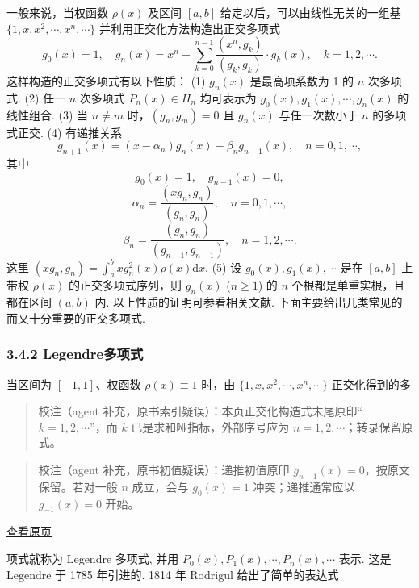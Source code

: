 \documentclass[
  10pt,
  fontset=fandol]{ctexart}
\begin{document}
一般来说，当权函数 \(\rho(x)\) 及区间 \([a, b]\) 给定以后，可以由线性无关的一组基 \(\{1,\allowbreak  x,\allowbreak  x^2,\allowbreak  \cdots,\allowbreak  x^n,\allowbreak  \cdots\}\) 并利用正交化方法构造出正交多项式 \[
g_0(x) = 1, \quad g_n(x) = x^n - \sum_{k=0}^{n-1} \frac{(x^n, g_k)}{(g_k, g_k)} \cdot g_k(x), \quad k = 1, 2, \cdots.
\] 这样构造的正交多项式有以下性质： (1) \(g_n(x)\) 是最高项系数为 1 的 \(n\) 次多项式. (2) 任一 \(n\) 次多项式 \(P_n(x) \in H_n\) 均可表示为 \(g_0(x), g_1(x), \cdots, g_n(x)\) 的线性组合. (3) 当 \(n \neq m\) 时，\((g_n, g_m) = 0\) 且 \(g_n(x)\) 与任一次数小于 \(n\) 的多项式正交. (4) 有递推关系 \[
g_{n+1}(x) = (x - \alpha_n)g_n(x) - \beta_n g_{n-1}(x), \quad n = 0, 1, \cdots,
\] 其中 \[
g_0(x) = 1, \quad g_{n-1}(x) = 0,
\] \[
\alpha_n = \frac{(xg_n, g_n)}{(g_n, g_n)}, \quad n = 0, 1, \cdots,
\] \[
\beta_n = \frac{(g_n, g_n)}{(g_{n-1}, g_{n-1})}, \quad n = 1, 2, \cdots.
\] 这里 \((xg_n, g_n) = \int_a^b xg_n^2(x) \rho(x) \mathrm{d}x.\) (5) 设 \(g_0(x), g_1(x), \cdots\) 是在 \([a, b]\) 上带权 \(\rho(x)\) 的正交多项式序列，则 \(g_n(x)\) (\(n \geq 1\)) 的 \(n\) 个根都是单重实根，且都在区间 \((a, b)\) 内. 以上性质的证明可参看相关文献. 下面主要给出几类常见的而又十分重要的正交多项式.

\subsubsection{3.4.2 Legendre多项式}\label{legendreux591aux9879ux5f0f}

当区间为 \([-1, 1]\)、权函数 \(\rho(x) \equiv 1\) 时，由 \(\{1,\allowbreak  x,\allowbreak  x^2,\allowbreak  \cdots,\allowbreak  x^n,\allowbreak  \cdots\}\) 正交化得到的多

\begin{quote}
校注（agent 补充，原书索引疑误）：本页正交化构造式末尾原印``\(k=1,2,\cdots\)''，而 \(k\) 已是求和哑指标，外部序号应为 \(n=1,2,\cdots\)；转录保留原式。
\end{quote}

\begin{quote}
校注（agent 补充，原书初值疑误）：递推初值原印 \(g_{n-1}(x)=0\)，按原文保留。若对一般 \(n\) 成立，会与 \(g_0(x)=1\) 冲突；递推通常应以 \(g_{-1}(x)=0\) 开始。
\end{quote}

\href{../../source-images/pdf-071.jpeg}{查看原页}

项式就称为 Legendre 多项式, 并用 \(P_0(x), P_1(x), \cdots, P_n(x), \cdots\) 表示. 这是 Legendre 于 1785 年引进的. 1814 年 Rodrigul 给出了简单的表达式
\end{document}

